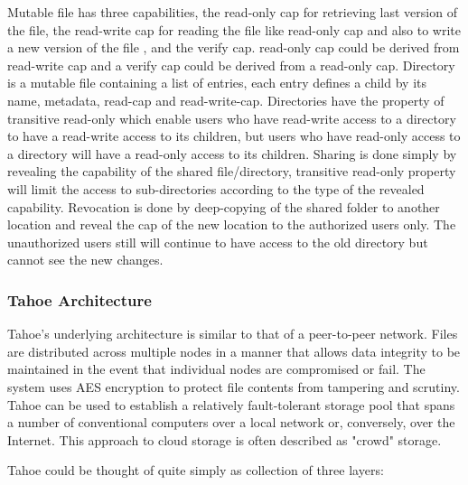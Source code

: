 \documentclass[11pt]{article}
\begin{document}
Mutable file has three capabilities, the read-only cap for retrieving 
last version of the file, the read-write cap for reading the file like 
read-only cap and also to write a new version of the file , and the 
verify cap. read-only cap could be derived from read-write cap and a 
verify cap could be derived from a read-only cap. Directory is a mutable 
file containing a list of entries, each entry defines a child by its name, 
metadata, read-cap and read-write-cap. Directories have the property of 
transitive read-only which enable users who have read-write access to a 
directory to have a read-write access to its children, but users who have 
read-only access to a directory will have a read-only access to its 
children. Sharing is done simply by revealing the capability of the shared 
file/directory, transitive read-only property will limit the access to 
sub-directories according to the type of the revealed capability. 
Revocation is done by deep-copying  of the shared folder to another 
location and reveal the cap of the new location to the authorized users 
only. The unauthorized users still will continue to have access to the 
old directory but cannot see the new changes.

\subsubsection{Tahoe Architecture}
Tahoe's underlying architecture is similar to that of a peer-to-peer 
network. Files are distributed across multiple nodes in a manner that 
allows data integrity to be maintained in the event that individual nodes 
are compromised or fail. The system uses AES encryption to protect file 
contents from tampering and scrutiny. Tahoe can be used to establish a 
relatively fault-tolerant storage pool that spans a number of conventional 
computers over a local network or, conversely, over the Internet. This 
approach to cloud storage is often described as "crowd" storage.

Tahoe could be thought of quite simply as collection of three layers: 
\end{document}
